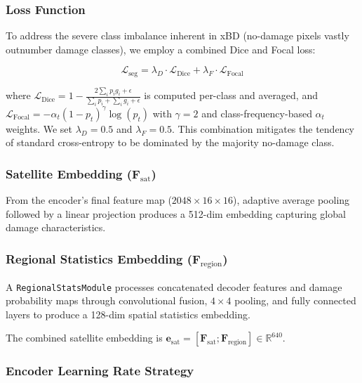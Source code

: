 \documentclass[journal]{IEEEtran}
\begin{document}
\subsubsection{Loss Function}

To address the severe class imbalance inherent in xBD (no-damage pixels vastly outnumber damage classes), we employ a combined Dice and Focal loss:

\begin{equation}
\mathcal{L}_\text{seg} = \lambda_D \cdot \mathcal{L}_\text{Dice} + \lambda_F \cdot \mathcal{L}_\text{Focal}
\end{equation}

where $\mathcal{L}_\text{Dice} = 1 - \frac{2\sum_i p_i g_i + \epsilon}{\sum_i p_i + \sum_i g_i + \epsilon}$ is computed per-class and averaged, and $\mathcal{L}_\text{Focal} = -\alpha_t (1-p_t)^\gamma \log(p_t)$ with $\gamma=2$ and class-frequency-based $\alpha_t$ weights. We set $\lambda_D = 0.5$ and $\lambda_F = 0.5$. This combination mitigates the tendency of standard cross-entropy to be dominated by the majority no-damage class.

\subsubsection{Satellite Embedding ($\mathbf{F}_\text{sat}$)}

From the encoder's final feature map ($2048 \times 16 \times 16$), adaptive average pooling followed by a linear projection produces a 512-dim embedding capturing global damage characteristics.

\subsubsection{Regional Statistics Embedding ($\mathbf{F}_\text{region}$)}

A \texttt{RegionalStatsModule} processes concatenated decoder features and damage probability maps through convolutional fusion, $4 \times 4$ pooling, and fully connected layers to produce a 128-dim spatial statistics embedding.

The combined satellite embedding is $\mathbf{e}_\text{sat} = [\mathbf{F}_\text{sat}; \mathbf{F}_\text{region}] \in \mathbb{R}^{640}$.

\subsubsection{Encoder Learning Rate Strategy}
\end{document}
